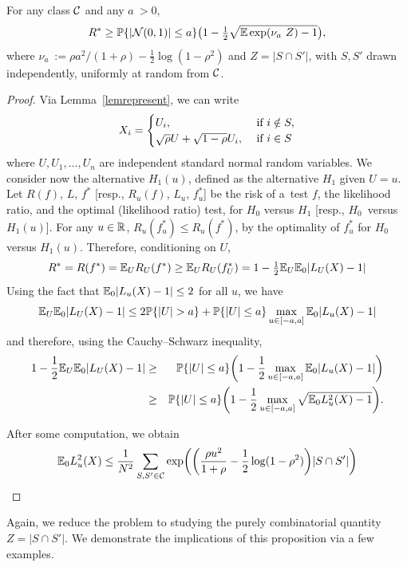 \documentclass[10pt, oneside]{article}
\begin{document}
\begin{prop}
  \label{thmlower}
For any class ${\mathcal C}$ and any $a~> 0$,
\[
R^* \geq\mathbb{P}\{|{\mathcal N}(0,1)| \le a\} \bigl(1 - \tfrac12 \sqrt{\mathbb{E}
\exp
(\nu_a~Z ) - 1}\bigr),
\]
where $\nu_a~:= \rho a^2/(1+\rho)- \frac12 \log(1-\rho^2)$ and
$Z=|S \cap S'|$, with $S, S'$ drawn independently, uniformly at random
from ${\mathcal C}$.
\end{prop}

\begin{proof}
  Via Lemma~\ref{lemrepresent}, we can write 
    \[
    X_i = \begin{cases}
    U_i, \quad & \mbox{ if } i \notin S, \cr
    \sqrt{\rho}  U + \sqrt{1-\rho}  U_i, & \mbox{ if } i \in S
    \end{cases}
    \]
  where $U,U_1,\ldots,U_n$ are independent standard normal random variables.
  We consider now the alternative $H_1(u)$, defined as the alternative
$H_1$ given \mbox{$U=u$}.
Let $R(f)$, $L$, $f^*$ [resp., $R_u(f)$, $L_u$, $f_u^*$] be the risk of
a~test $f$, the likelihood ratio, and the optimal (likelihood ratio)
test, for $H_0$ versus $H_1$ [resp., $H_0$~versus $H_1(u)$]. For any $u
\in{\mathbb R}$, $R_u(f_u^*) \leq R_u(f^*)$, by the optimality of $f_u^*$
for $H_0$ versus $H_1(u)$. Therefore, conditioning on $U$,
$$R^* = R(f^*) = \mathbb{E}_{U} R_U(f^*) \geq \mathbb{E}_{U} R_U(f_U^*) = 1 - \tfrac{1}{2} \mathbb{E}_{U} \mathbb{E}_0 |L_U(X) - 1|$$
Using the fact that
$\mathbb{E}_0 |L_u(X) - 1| \le2$ for all $u$, we have
%
\[
\bE_{U} \bE_0 |L_U(X) - 1|
\le2\bP\{|U|>a\} + \bP\{|U|\le a\} \max_{u \in[-a,a]} \bE_0
|L_u(X) - 1|
\]
%
and therefore, using the Cauchy--Schwarz inequality,
%
\begin{eqnarray*}
1 - \frac{1}{2} \mathbb{E}_{U} \mathbb{E}_0 |L_U(X) - 1|
& \ge&
\mathbb{P}\{|U|\le a\}\biggl( 1-\frac{1}{2}\max_{u \in[-a,a]} \mathbb{E}_0
|L_u(X) - 1|\biggr)
\\
& \geq& \mathbb{P}\{|U|\le a\}\biggl(1 - \frac12 \max_{u \in[-a,a]}
\sqrt{\mathbb{E}_0 L_u^2(X) - 1}\biggr).
\end{eqnarray*}

After some computation, we obtain 
$$\mathbb{E}_0 L_u^2(X) \le \frac{1}{N^2} \sum_{S, S' \in{\mathcal C}}
\exp\biggl(\biggl(\frac{\rho u^2}{1+\rho}- \frac12\log(1-\rho
^2)\biggr) |S \cap S'| \biggr)$$
\end{proof}

Again, we reduce the problem to studying the purely combinatorial quantity $Z = |S \cap S'|$. We demonstrate the implications of this proposition via a few examples.
\end{document}
